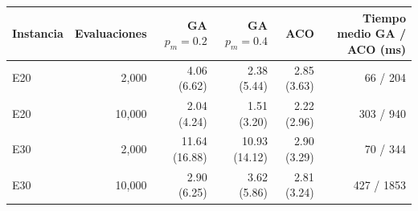 \begin{tabular}{lrrrrr}\toprule
Instancia & Evaluaciones & GA $p_m=0.2$ & GA $p_m=0.4$ & ACO & Tiempo medio GA / ACO (ms)\\\midrule
E20 & 2,000 & 4.06 (6.62) & 2.38 (5.44) & 2.85 (3.63) & 66 / 204\\
E20 & 10,000 & 2.04 (4.24) & 1.51 (3.20) & 2.22 (2.96) & 303 / 940\\
E30 & 2,000 & 11.64 (16.88) & 10.93 (14.12) & 2.90 (3.29) & 70 / 344\\
E30 & 10,000 & 2.90 (6.25) & 3.62 (5.86) & 2.81 (3.24) & 427 / 1853\\
\bottomrule\end{tabular}
